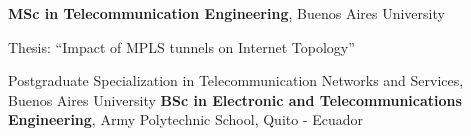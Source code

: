%
%
%


\begin{scholarship}
					{ \textbf{MSc in Telecommunication Engineering}, Buenos Aires University 

					Thesis: “Impact of MPLS tunnels on Internet Topology”}
					{Postgraduate Specialization in Telecommunication Networks and Services, Buenos Aires University}
					{\textbf{BSc in Electronic and Telecommunications Engineering}, Army Polytechnic School, Quito - Ecuador}
\end{scholarship}
